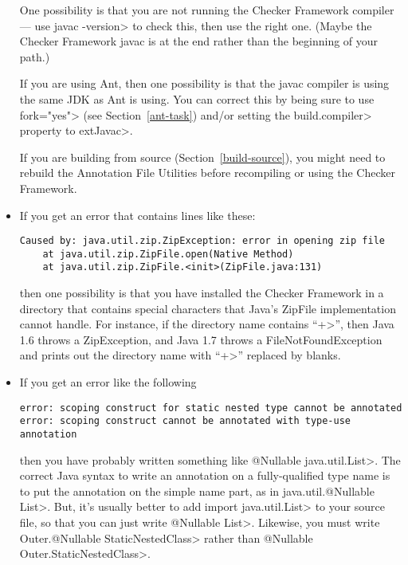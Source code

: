\begin{itemize}
One possibility is that you are not running the Checker Framework compiler
--- use \<javac -version> to check this, then use the right one.  (Maybe
the Checker Framework javac is at the end rather than the beginning of your
path.)

If you are using Ant, then one possibility
is that the javac compiler is using the same JDK as Ant is using.  You can
correct this by being sure to use \<fork="yes"> (see
Section~\ref{ant-task}) and/or setting the \<build.compiler> property to
\<extJavac>.

If you are building from source (Section~\ref{build-source}),
you might need to rebuild the Annotation
File Utilities before recompiling or using the Checker Framework.


\item
If you get an error that contains lines like these:

\begin{Verbatim}
Caused by: java.util.zip.ZipException: error in opening zip file
    at java.util.zip.ZipFile.open(Native Method)
    at java.util.zip.ZipFile.<init>(ZipFile.java:131)
\end{Verbatim}

\noindent
then one possibility is that you have installed the Checker Framework in a
directory that contains special characters that Java's ZipFile
implementation cannot handle.  For instance, if the directory name contains
``\<+>'', then Java 1.6 throws a ZipException, and Java 1.7 throws a
FileNotFoundException and prints out the directory name with ``\<+>''
replaced by blanks.

\item
If you get an error like the following

\begin{Verbatim}
error: scoping construct for static nested type cannot be annotated
error: scoping construct cannot be annotated with type-use annotation
\end{Verbatim}

\noindent
\begin{sloppypar}
then you have probably written something like \<@Nullable java.util.List>.
The correct Java syntax to write an annotation on a fully-qualified type
name is to put the annotation on the simple name part, as in
\<java.util.@Nullable List>.  But, it's usually
better to add \<import java.util.List> to your source file, so that you can
just write \<@Nullable List>.  Likewise, you must write \<Outer.@Nullable
StaticNestedClass> rather than \<@Nullable Outer.StaticNestedClass>.
\end{sloppypar}


\end{itemize}
